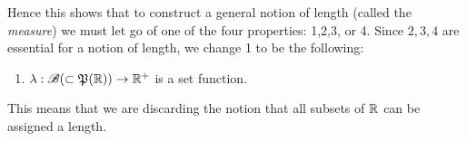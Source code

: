 Hence this shows that to construct a general notion of length (called the \textit{measure}) we must let go of one of the four properties: 1,2,3, or 4. Since $2,3,4$ are essential for a notion of length, we change 1 to be the following:
\begin{enumerate}
  \item  $\lambda: \mathscr{B}(\subset\mathfrak{P} (\mathbb{R}))\to \mathbb{R}^{+}$ is a set function.
\end{enumerate}
This means that we are discarding the notion that all subsets of $\mathbb{R}$ can be assigned a length. 
